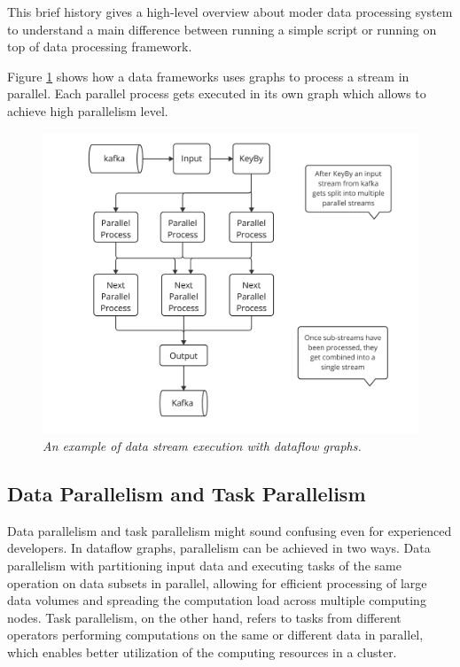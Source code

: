 This brief history gives a high-level overview about moder data processing system to
understand a main difference between running a simple script or running on top of
data processing framework.

Figure \ref{fig:dataflow-graph} shows how a data frameworks uses graphs
to process a stream in parallel.
Each parallel process gets executed in its own graph which allows to achieve high
parallelism level.

\begin{figure}[H]
    \centering
    \includegraphics[width=1\textwidth]{figures/dataflow-graph}
    \caption{\textit{An example of data stream execution with dataflow graphs.}}
    \label{fig:dataflow-graph}
\end{figure}

\newpage

\subsection{Data Parallelism and Task Parallelism}\label{subsec:data-parallelism-and-task-parallelism}
Data parallelism and task parallelism might sound confusing even for experienced developers.
In dataflow graphs, parallelism can be achieved in two ways.
Data parallelism with partitioning input data and executing tasks of
the same operation on data subsets in parallel, allowing for efficient processing
of large data volumes and spreading the computation load across multiple computing nodes.
Task parallelism, on the other hand, refers to tasks from different operators
performing computations on the same or different data in parallel,
which enables better utilization of the computing resources in a cluster.


